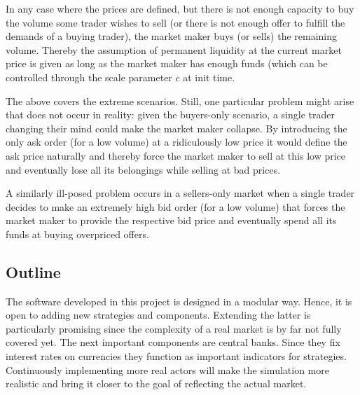 In any case where the prices are defined, but there is not enough capacity to buy the
volume some trader wishes to sell (or there is not enough offer to fulfill the demands
of a buying trader), the market maker buys (or sells) the remaining volume. Thereby the
assumption of permanent liquidity at the current market price is given as long as the
market maker has enough funds (which can be controlled through the scale parameter $c$
at init time.

The above covers the extreme scenarios. Still, one particular problem might arise that
does not occur in reality: given the buyers-only scenario, a single trader changing
their mind could make the market maker collapse. By introducing the only ask order (for a low volume) at 
a ridiculously low price it would define the ask price naturally and thereby force
the market maker to sell at this low price and eventually lose all its belongings
while selling at bad prices.

A similarly ill-posed problem occurs in a sellers-only market when a single trader
decides to make an extremely high bid order (for a low volume) that forces the market
maker to provide the respective bid price and eventually spend all its funds at buying
overpriced offers.

\subsection{Outline}
The software developed in this project is designed in a modular way. Hence, it is open
to adding new strategies and components. Extending the latter is particularly 
promising since the complexity of a real market is by far not fully covered yet. The next
important components are central banks. Since they fix interest rates on currencies 
they function as important indicators for strategies. Continuously implementing more
real actors will make the simulation more realistic and bring it closer to the goal 
of reflecting the actual market.


